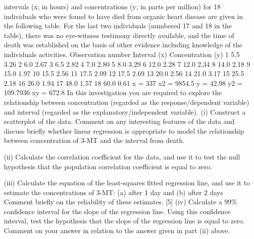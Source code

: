 intervals (x; in hours) and concentrations (y; in parts per million) for 18 individuals
who were found to have died from organic heart disease are given in the following
table. For the last two individuals (numbered 17 and 18 in the table), there was no
eye-witness testimony directly available, and the time of death was established on the
basis of other evidence including knowledge of the individuals activities.
Observation
number
Interval
(x)
Concentration
(y)
1 5.5 3.26
2 6.0 2.67
3 6.5 2.82
4 7.0 2.80
5 8.0 3.29
6 12.0 2.28
7 12.0 2.34
8 14.0 2.18
9 15.0 1.97
10 15.5 2.56
11 17.5 2.09
12 17.5 2.69
13 20.0 2.56
14 21.0 3.17
15 25.5 2.18
16 26.0 1.94
17 48.0 1.57
18 60.0 0.61
x = 337 x2 = 9854.5 y = 42.98 y2 = 109.7936 xy = 672.8
In this investigation you are required to explore the relationship between
concentration (regarded as the response/dependent variable) and interval (regarded as
the explanatory/independent variable).
(i) Construct a scatterplot of the data. Comment on any interesting features of the
data and discuss briefly whether linear regression is appropriate to model the
relationship between concentration of 3-MT and the interval from death.

(ii) Calculate the correlation coefficient for the data, and use it to test the null
hypothesis that the population correlation coefficient is equal to zero.

(iii) Calculate the equation of the least-squares fitted regression line, and use it to
estimate the concentrations of 3-MT:
(a) after 1 day and
(b) after 2 days
Comment briefly on the reliability of these estimates. [5]
(iv) Calculate a 99\% confidence interval for the slope of the regression line. Using
this confidence interval, test the hypothesis that the slope of the regression line
is equal to zero. Comment on your answer in relation to the answer given in
part (ii) above.

